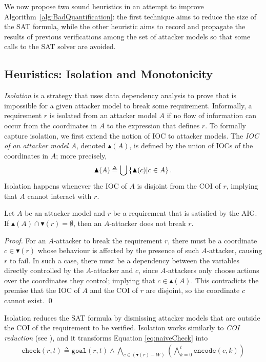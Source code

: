 We now propose two sound heuristics in an attempt to improve Algorithm~\ref{alg:BadQuantification}: the first technique aims to reduce the size of the SAT formula, while the other heuristic aims to record and propagate the results of previous verifications among the set of attacker models so that some calls to the SAT solver are avoided.

\subsection{Heuristics: Isolation and Monotonicity}
\emph{Isolation} is a strategy that uses data dependency analysis to prove that is impossible for a given attacker model to break some requirement. Informally, a requirement $r$ is isolated from an attacker model $A$ if no flow of information can occur from the coordinates in $A$ to the expression that defines $r$. To formally capture isolation, we first extend the notion of IOC to attacker models. The \emph{IOC of an attacker model $A$}, denoted $\blacktriangle(A)$, is defined by the union of IOCs of the coordinates in $A$; more precisely, 
\begin{align}
	\blacktriangle(A) \triangleq \bigcup\left\{\blacktriangle(c)|c \in A\right\}.
\end{align}
Isolation happens whenever the IOC of $A$ is disjoint from the COI of $r$, implying that $A$ cannot interact with $r$.
\begin{proposition}[Isolation]
\label{theo:isolation}
Let $A$ be an attacker model and $r$ be a requirement that is satisfied by the AIG. If $\blacktriangle(A)\cap \blacktriangledown(r)=\emptyset$, then an $A$-attacker does not break $r$.\end{proposition}
\begin{proof}

For an $A$-attacker to break the requirement $r$, there must be a coordinate $c \in \blacktriangledown(r)$ whose behaviour is affected by the presence of such $A$-attacker, causing $r$ to fail. In such a case, there must be a dependency between the variables directly controlled by the $A$-attacker and $c$, since $A$-attackers only choose actions over the coordinates they control; implying that $c\in \blacktriangle(A)$. This contradicts the premise that the IOC of $A$ and the COI of $r$ are disjoint, so the coordinate $c$ cannot exist. \qed
\end{proof}

Isolation reduces the SAT formula by dismissing attacker models that are outside the COI of the requirement to be verified. Isolation works similarly to \emph{COI reduction} (see \cite{ToSplitOrToGroup,GraphLabelingForEfficientCOIComputation,HandbookOfSatisfiability,HandbookOfModelChecking,OptimizedModelCheckingOfMultipleProperties}), and it transforms Equation \ref{eq:naiveCheck} into
\begin{align}
\label{eq:isolation}
\mathtt{check}(r,t)\triangleq\mathtt{goal}(r,t)\land\! \bigwedge_{c\in (\blacktriangledown(r)- W)}\left( \bigwedge_{k=0}^{t}{\mathtt{encode}(c,k)}\right)
\end{align}


